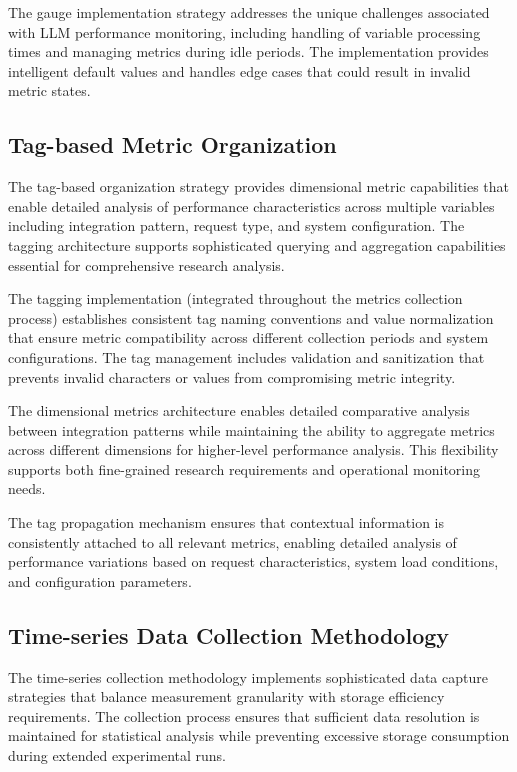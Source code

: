 The gauge implementation strategy addresses the unique challenges associated with LLM performance monitoring, including handling of variable processing times and managing metrics during idle periods. The implementation provides intelligent default values and handles edge cases that could result in invalid metric states.

\subsection{Tag-based Metric Organization}

The tag-based organization strategy provides dimensional metric capabilities that enable detailed analysis of performance characteristics across multiple variables including integration pattern, request type, and system configuration. The tagging architecture supports sophisticated querying and aggregation capabilities essential for comprehensive research analysis.

The tagging implementation (integrated throughout the metrics collection process) establishes consistent tag naming conventions and value normalization that ensure metric compatibility across different collection periods and system configurations. The tag management includes validation and sanitization that prevents invalid characters or values from compromising metric integrity.

The dimensional metrics architecture enables detailed comparative analysis between integration patterns while maintaining the ability to aggregate metrics across different dimensions for higher-level performance analysis. This flexibility supports both fine-grained research requirements and operational monitoring needs.

The tag propagation mechanism ensures that contextual information is consistently attached to all relevant metrics, enabling detailed analysis of performance variations based on request characteristics, system load conditions, and configuration parameters.

\subsection{Time-series Data Collection Methodology}

The time-series collection methodology implements sophisticated data capture strategies that balance measurement granularity with storage efficiency requirements. The collection process ensures that sufficient data resolution is maintained for statistical analysis while preventing excessive storage consumption during extended experimental runs.

